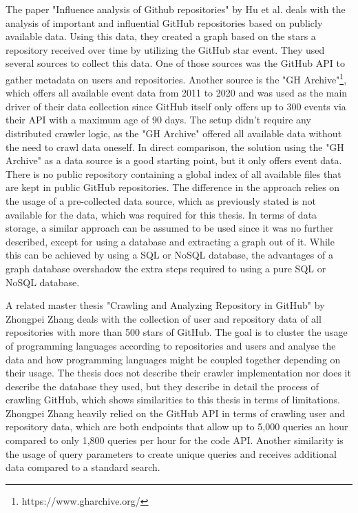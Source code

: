The paper "Influence analysis of Github repositories" \cite{influencegithub} by Hu et al. deals with the analysis of important and influential GitHub repositories based on publicly available data. Using this data, they created a graph based on the stars a repository received over time by utilizing the GitHub star event. They used several sources to collect this data. One of those sources was the GitHub API to gather metadata on users and repositories. Another source is the "GH Archive"\footnote{https://www.gharchive.org/}, which offers all available event data from 2011 to 2020 and was used as the main driver of their data collection since GitHub itself only offers up to 300 events via their API with a maximum age of 90 days. The setup didn't require any distributed crawler logic, as the "GH Archive" offered all available data without the need to crawl data oneself. In direct comparison, the solution using the "GH Archive" as a data source is a good starting point, but it only offers event data. There is no public repository containing a global index of all available files that are kept in public GitHub repositories. The difference in the approach relies on the usage of a pre-collected data source, which as previously stated is not available for the data, which was required for this thesis. In terms of data storage, a similar approach can be assumed to be used since it was no further described, except for using a database and extracting a graph out of it. While this can be achieved by using a SQL or NoSQL database, the advantages of a graph database overshadow the extra steps required to using a pure SQL or NoSQL database.

A related master thesis "Crawling and Analyzing Repository in GitHub" \cite{Zhang2016CrawlingAA} by Zhongpei Zhang deals with the collection of user and repository data of all repositories with more than 500 stars of GitHub. The goal is to cluster the usage of programming languages according to repositories and users and analyse the data and how programming languages might be coupled together depending on their usage. The thesis does not describe their crawler implementation nor does it describe the database they used, but they describe in detail the process of crawling GitHub, which shows similarities to this thesis in terms of limitations. Zhongpei Zhang heavily relied on the GitHub API in terms of crawling user and repository data, which are both endpoints that allow up to 5,000 queries an hour compared to only 1,800 queries per hour for the code API. Another similarity is the usage of query parameters to create unique queries and receives additional data compared to a standard search.

